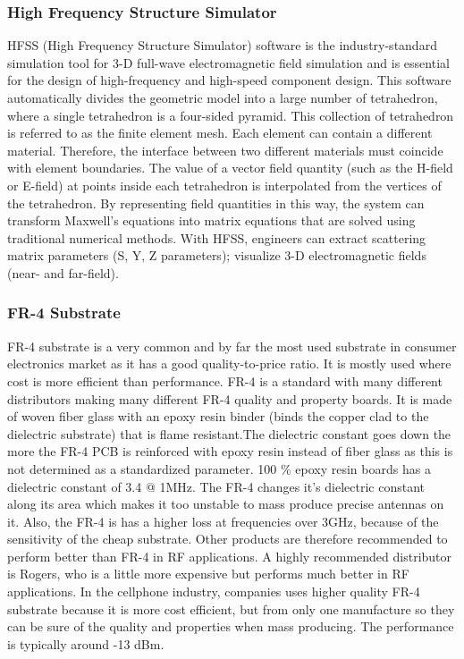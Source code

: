 \documentclass[12pt]{article}
\begin{document}
	           \subsubsection{High Frequency Structure Simulator }
	            \justify
	                HFSS (High Frequency Structure Simulator) software is the industry-standard simulation tool for 3-D full-wave electromagnetic field simulation and is essential for the design of high-frequency and high-speed component design. This software automatically divides the geometric model into a large number of tetrahedron, where a single tetrahedron is a four-sided pyramid. This collection of tetrahedron is referred to as the finite element mesh. Each element can contain a different material. Therefore, the interface between two different materials must coincide with element boundaries. The value of a vector field quantity (such as the H-field or E-field) at points inside each tetrahedron is interpolated from the vertices of the tetrahedron. By representing field quantities in this way, the system can transform Maxwell's equations into matrix equations that are solved using traditional numerical methods. With HFSS, engineers can extract scattering matrix parameters (S, Y, Z parameters); visualize 3-D electromagnetic fields (near- and far-field). 
	                
	             \subsubsection{FR-4 Substrate}
		           \justify
		            FR-4 substrate is a very common and by far the most used substrate in consumer electronics market as it has a good quality-to-price ratio. It is mostly used where cost is more efficient than performance. FR-4 is a standard with many different distributors making many different FR-4 quality and property boards. It is made of woven fiber glass with an epoxy resin binder (binds the copper clad to the dielectric substrate) that is flame resistant.The dielectric constant goes down the more the FR-4 PCB is reinforced with epoxy resin instead of fiber glass as this is not determined as a standardized parameter. 100 \% epoxy resin boards has a dielectric constant of 3.4 @ 1MHz.
		           \justify
		           	The FR-4 changes it’s dielectric constant along its area which makes it too unstable to mass produce precise antennas on it. Also, the FR-4 is has a higher loss at frequencies over 3GHz, because of the sensitivity of the cheap substrate. Other products are therefore recommended to perform better than FR-4 in RF applications. A highly recommended distributor is Rogers, who is a little more expensive but performs much better in RF applications. In the cellphone industry, companies uses higher quality FR-4 substrate because it is more cost efficient, but from only one manufacture so they can be sure of the quality and properties when mass producing. The performance is typically around -13 dBm.\\
					
\end{document}
